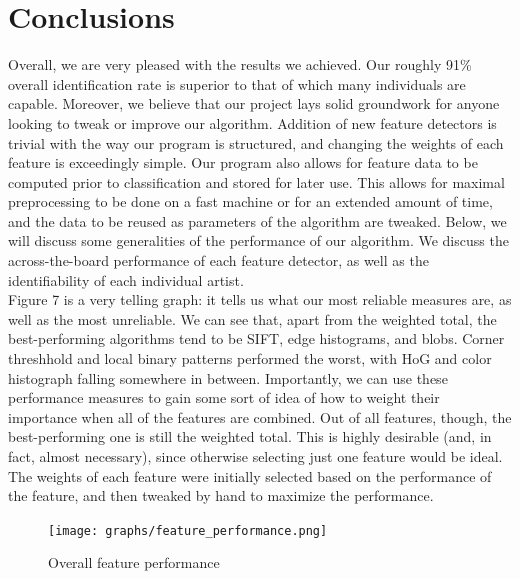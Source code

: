 \documentclass{article}
\begin{document}
  \section{Conclusions}
  Overall, we are very pleased with the results we achieved. Our roughly 91\% overall
  identification rate is superior to that of which many individuals are capable.
  Moreover, we believe that our project lays solid groundwork for anyone looking
  to tweak or improve our algorithm. Addition of new feature detectors is
  trivial with the way our program is structured, and changing the weights of
  each feature is exceedingly simple. Our program also allows for feature data
  to be computed prior to classification and stored for later use. This allows
  for maximal preprocessing to be done on a fast machine or for an extended
  amount of time, and the data to be reused as parameters of the algorithm are
  tweaked. Below, we will discuss some generalities of the performance of our
  algorithm. We discuss the across-the-board performance of each feature
  detector, as well as the identifiability of each individual artist. \\

  Figure 7 is a very telling graph: it tells us what our most reliable measures
  are, as well as the most unreliable. We can see that, apart from the weighted
  total, the best-performing algorithms tend to be SIFT, edge histograms, and blobs.
  Corner threshhold and local binary patterns performed the worst, with HoG and
  color histograph falling somewhere in between. Importantly, we can use these
  performance measures to gain some sort of idea of how to weight their
  importance when all of the features are combined. Out of all features, though,
  the best-performing one is still the weighted total. This is highly desirable
  (and, in fact, almost necessary), since otherwise selecting just one feature
  would be ideal. The weights of each feature were initially selected based on
  the performance of the feature, and then tweaked by hand to maximize the
  performance. 
  \begin{figure}[h!]
    \begin{center}
      \texttt{[image: graphs/feature\_performance.png]}
      \caption{Overall feature performance}
    \end{center}
  \end{figure} \\
\end{document}
